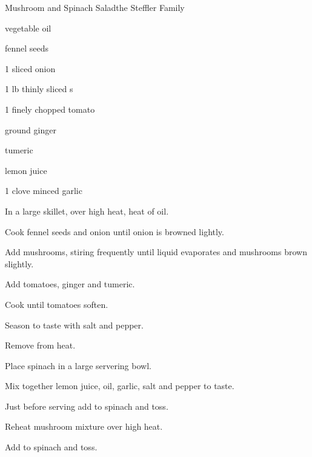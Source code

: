 \begin{recipe}{Mushroom and Spinach Salad}{the Steffler Family}{}

\begin{ingredients}
\item {} vegetable oil
\item {} fennel seeds
\item 1 sliced onion
\item 1 lb thinly sliced s
\item 1 finely chopped tomato
\item \tp{\half} ground ginger
\item \tp{\quarter} tumeric
\item {} lemon juice
\item 1 clove minced garlic
\item {} 
\end{ingredients}

\begin{directions}
\item In a large skillet, over high heat, heat  of oil.
\item Cook fennel seeds and onion until onion is browned lightly.
\item Add mushrooms, stiring frequently until liquid evaporates and mushrooms brown slightly.
\item Add tomatoes, ginger and tumeric.
\item Cook until tomatoes soften.
\item Season to taste with salt and pepper.
\item Remove from heat.
\item Place spinach in a large servering bowl.
\item Mix together lemon juice, oil, garlic, salt and pepper to taste.
\item Just before serving add to spinach and toss.
\item Reheat mushroom mixture over high heat.
\item Add to spinach and toss.
\end{directions}
\end{recipe}
